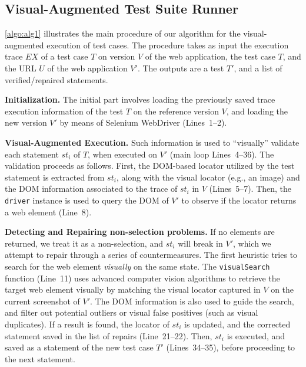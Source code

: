 \subsection{Visual-Augmented Test Suite Runner}

\autoref{algo:alg1} illustrates the main procedure of our algorithm for the visual-augmented execution of test cases. The procedure takes as input the execution trace $EX$ of a test case $T$ on version $V$ of the web application, the test case $T$, and the URL $U$ of the web application $V'$. The outputs are a test $T'$, and a list of verified/repaired statements. 

\noindent
\textbf{Initialization.} 
The initial part involves loading the previously saved trace execution information of the test $T$ on the reference version $V$, and loading the new version $V'$ by means of Selenium WebDriver (Lines~1--2). 

\noindent
\textbf{Visual-Augmented Execution.}
Such information is used to ``visually'' validate each statement $st_i$ of $T$, when executed on $V'$ (main loop Lines~4--36). The validation proceeds as follows. First, the DOM-based locator utilized by the test statement is extracted from $st_i$, along with the visual locator (e.g., an image) and the DOM information associated to the trace of $st_i$ in $V$  (Lines~5--7). Then, the \texttt{driver} instance is used to query the DOM of $V'$ to observe if the locator returns a web element (Line~8). 



\noindent
\textbf{Detecting and Repairing non-selection problems.}
If no elements are returned, we treat it as a non-selection, and $st_i$ will break in $V'$, which we attempt to repair through a series of countermeasures. The first heuristic tries to search for the web element \textit{visually} on the same state. The \texttt{visualSearch} function (Line~11) uses advanced computer vision algorithms to retrieve the target web element visually by  matching the visual locator captured in $V$ on the current screenshot of $V'$. The DOM information is also used to guide the search, and filter out potential outliers or visual false positives (such as visual duplicates). If a result is found, the locator of $st_i$ is updated, and the corrected statement saved in the list of repairs (Line~21--22). Then, $st_i$ is executed, and saved as a statement of the new test case $T'$ (Lines~34--35), before proceeding to the next statement.

